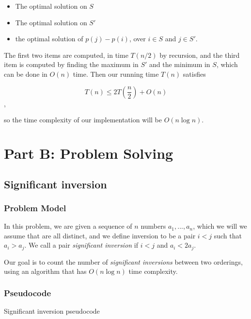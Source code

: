 \documentclass{article}
\begin{document}
\begin{itemize}
 \item The optimal solution on $S$
 \item The optimal solution on $S'$
 \item the optimal solution of $p(j)-p(i)$, over $i \in S$ and $j \in S'$.
\end{itemize}

The first two items are computed, in time $T(n/2)$ by recursion, and the third item is computed by finding the maximum in $S'$ and the minimum in $S$, which can be done in $O(n)$ time. Then our running time $T(n)$ satisfies

$$T(n) \leq 2T(\frac{n}{2})+O(n)$$,

so the time complexity of our implementation will be $O(n\log n)$.


\section*{Part B: Problem Solving}

\subsection*{Significant inversion}

\subsubsection*{Problem Model}

In this problem, we are given a sequence of $n$ numbers $a_1,...,a_n$, which we will we assume that are all distinct, and we define inversion to be a pair $i<j$ such that $a_i>a_j$. We call a pair \textit{significant inversion} if $i<j$ and $a_i<2a_j$.

Our goal is to count the number of \textit{significant inversions} between two orderings, using an algorithm that has $O(n \log n)$ time complexity.

\subsubsection*{Pseudocode}

\begin{algorithm}[H]
\caption{Significant inversion pseudocode}
\begin{algorithmic}[1]
\end{algorithmic}
\end{algorithm}
\end{document}
